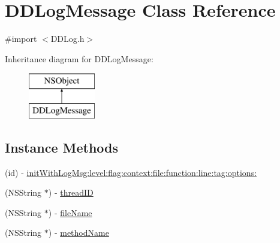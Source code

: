 \hypertarget{interface_d_d_log_message}{\section{D\-D\-Log\-Message Class Reference}
\label{interface_d_d_log_message}
}


{\ttfamily \#import $<$D\-D\-Log.\-h$>$}

Inheritance diagram for D\-D\-Log\-Message\-:\begin{figure}[H]
\begin{center}
\leavevmode
\includegraphics[height=2.000000cm]{interface_d_d_log_message}
\end{center}
\end{figure}
\subsection*{Instance Methods}
\begin{DoxyCompactItemize}
\item 
(id) -\/ \hyperlink{interface_d_d_log_message_a5433e86d148fb414ebb7789643157185}{init\-With\-Log\-Msg\-:level\-:flag\-:context\-:file\-:function\-:line\-:tag\-:options\-:}
\item 
(N\-S\-String $\ast$) -\/ \hyperlink{interface_d_d_log_message_afed8f3af48724153b1e32a8636db9e01}{thread\-I\-D}
\item 
(N\-S\-String $\ast$) -\/ \hyperlink{interface_d_d_log_message_a9336f172bf69f18271e46da8040dbada}{file\-Name}
\item 
(N\-S\-String $\ast$) -\/ \hyperlink{interface_d_d_log_message_a4696a5d9c7f939de4c765d1dd4452a98}{method\-Name}
\end{DoxyCompactItemize}
